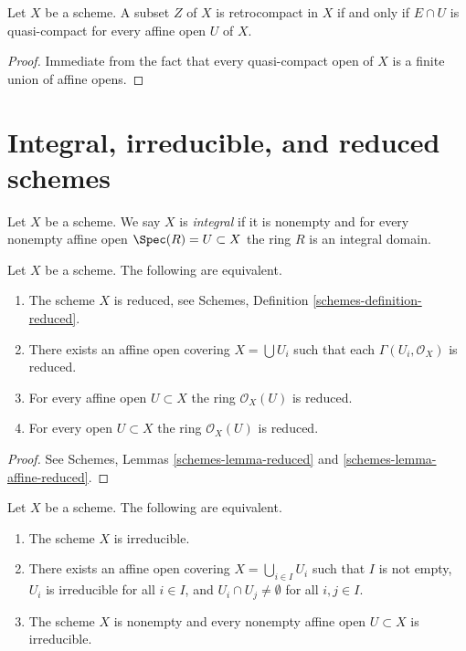 \begin{lemma}
\label{lemma-retrocompact}
Let $X$ be a scheme. A subset $Z$ of $X$ is retrocompact in $X$ if and only if
$E \cap U$ is quasi-compact for every affine open $U$ of $X$.
\end{lemma}

\begin{proof}
Immediate from the fact that every quasi-compact open of $X$ is a finite
union of affine opens.
\end{proof}





\section{Integral, irreducible, and reduced schemes}
\label{section-integral}

\begin{definition}
\label{definition-integral}
Let $X$ be a scheme. We say $X$ is {\it integral} if it is nonempty and
for every nonempty affine open $\Spec(R) = U \subset X$ the ring $R$
is an integral domain.
\end{definition}

\begin{lemma}
\label{lemma-characterize-reduced}
Let $X$ be a scheme.
The following are equivalent.
\begin{enumerate}
\item The scheme $X$ is reduced, see
Schemes, Definition \ref{schemes-definition-reduced}.
\item There exists an affine open covering $X = \bigcup U_i$
such that each $\Gamma(U_i, \mathcal{O}_X)$ is reduced.
\item For every affine open $U \subset X$ the ring
$\mathcal{O}_X(U)$ is reduced.
\item For every open $U \subset X$ the ring $\mathcal{O}_X(U)$ is reduced.
\end{enumerate}
\end{lemma}

\begin{proof}
See Schemes, Lemmas \ref{schemes-lemma-reduced} and
\ref{schemes-lemma-affine-reduced}.
\end{proof}

\begin{lemma}
\label{lemma-characterize-irreducible}
Let $X$ be a scheme.
The following are equivalent.
\begin{enumerate}
\item The scheme $X$ is irreducible.
\item There exists an affine open covering $X = \bigcup_{i \in I} U_i$
such that $I$ is not empty, $U_i$ is irreducible for all $i \in I$, and
$U_i \cap U_j \not = \emptyset$ for all $i, j \in I$.
\item The scheme $X$ is nonempty and every nonempty affine open
$U \subset X$ is irreducible.
\end{enumerate}
\end{lemma}

